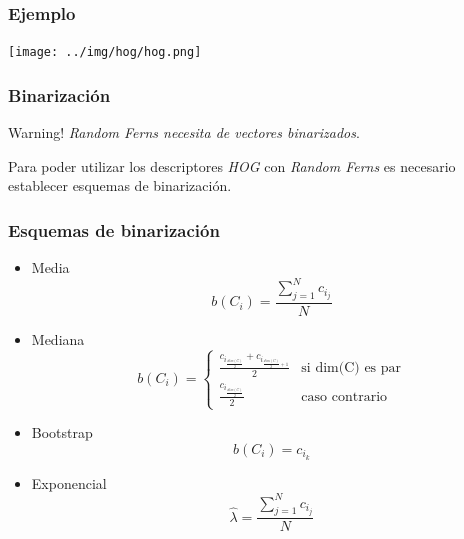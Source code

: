		\begin{frame}
			\frametitle{Ejemplo}
			\begin{center}
				\texttt{[image: ../img/hog/hog.png]}
			\end{center}
		\end{frame}	
		\begin{frame}
			\frametitle{Binarización}
			\alert{Warning!}	\textit{Random Ferns necesita de vectores binarizados}.
			
			Para poder utilizar los descriptores \textit{HOG} con \textit{Random Ferns} es necesario establecer esquemas de binarización.
		\end{frame}
		\begin{frame}
			\frametitle{Esquemas de binarización}
			\begin{itemize}
				\item<1-> Media
					$$b(C_i) = \frac{\sum_{j=1}^N c_{i_j}}{N} $$
				\item<2-> Mediana
	\[
    		b(C_i) = 
		\begin{cases}
    			\frac{c_{i_{\frac{dim(C)}{2}}} + c_{i_{\frac{dim(C)}{2}+1}}}{2} & \text{si dim(C) es par}\\
    			\frac{c_{i_{\frac{dim(C)}{2}}}}{2} & \text{caso contrario}
		\end{cases}
	\]
				\item<3-> Bootstrap
					$$ b(C_i) = c_{i_k} $$
				\item<4-> Exponencial
					$$\hat{\lambda} = \frac{\sum_{j=1}^N c_{i_j}}{N} $$
			\end{itemize}
		\end{frame}
